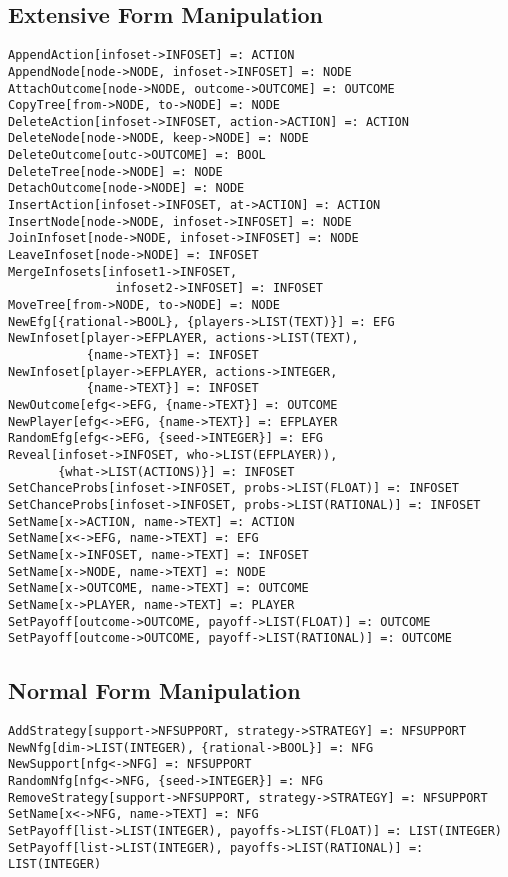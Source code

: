 \subsection{Extensive Form Manipulation}

\begin{verbatim}
AppendAction[infoset->INFOSET] =: ACTION
AppendNode[node->NODE, infoset->INFOSET] =: NODE
AttachOutcome[node->NODE, outcome->OUTCOME] =: OUTCOME
CopyTree[from->NODE, to->NODE] =: NODE
DeleteAction[infoset->INFOSET, action->ACTION] =: ACTION
DeleteNode[node->NODE, keep->NODE] =: NODE
DeleteOutcome[outc->OUTCOME] =: BOOL
DeleteTree[node->NODE] =: NODE
DetachOutcome[node->NODE] =: NODE
InsertAction[infoset->INFOSET, at->ACTION] =: ACTION
InsertNode[node->NODE, infoset->INFOSET] =: NODE
JoinInfoset[node->NODE, infoset->INFOSET] =: NODE
LeaveInfoset[node->NODE] =: INFOSET
MergeInfosets[infoset1->INFOSET,
               infoset2->INFOSET] =: INFOSET
MoveTree[from->NODE, to->NODE] =: NODE
NewEfg[{rational->BOOL}, {players->LIST(TEXT)}] =: EFG
NewInfoset[player->EFPLAYER, actions->LIST(TEXT),
           {name->TEXT}] =: INFOSET
NewInfoset[player->EFPLAYER, actions->INTEGER,
           {name->TEXT}] =: INFOSET
NewOutcome[efg<->EFG, {name->TEXT}] =: OUTCOME
NewPlayer[efg<->EFG, {name->TEXT}] =: EFPLAYER 
RandomEfg[efg<->EFG, {seed->INTEGER}] =: EFG
Reveal[infoset->INFOSET, who->LIST(EFPLAYER)),
       {what->LIST(ACTIONS)}] =: INFOSET
SetChanceProbs[infoset->INFOSET, probs->LIST(FLOAT)] =: INFOSET
SetChanceProbs[infoset->INFOSET, probs->LIST(RATIONAL)] =: INFOSET
SetName[x->ACTION, name->TEXT] =: ACTION
SetName[x<->EFG, name->TEXT] =: EFG
SetName[x->INFOSET, name->TEXT] =: INFOSET
SetName[x->NODE, name->TEXT] =: NODE
SetName[x->OUTCOME, name->TEXT] =: OUTCOME
SetName[x->PLAYER, name->TEXT] =: PLAYER
SetPayoff[outcome->OUTCOME, payoff->LIST(FLOAT)] =: OUTCOME
SetPayoff[outcome->OUTCOME, payoff->LIST(RATIONAL)] =: OUTCOME
\end{verbatim}

\subsection{Normal Form Manipulation}

\begin{verbatim}
AddStrategy[support->NFSUPPORT, strategy->STRATEGY] =: NFSUPPORT
NewNfg[dim->LIST(INTEGER), {rational->BOOL}] =: NFG
NewSupport[nfg<->NFG] =: NFSUPPORT
RandomNfg[nfg<->NFG, {seed->INTEGER}] =: NFG
RemoveStrategy[support->NFSUPPORT, strategy->STRATEGY] =: NFSUPPORT
SetName[x<->NFG, name->TEXT] =: NFG
SetPayoff[list->LIST(INTEGER), payoffs->LIST(FLOAT)] =: LIST(INTEGER)
SetPayoff[list->LIST(INTEGER), payoffs->LIST(RATIONAL)] =: LIST(INTEGER)
\end{verbatim}

